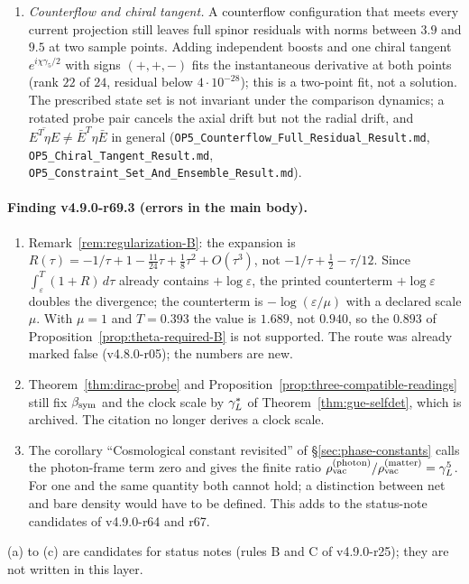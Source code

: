 \begin{enumerate}[leftmargin=2em]
reconstructed geometry requires \(b+3tb'=1\) and \((hb^2)'=0\); the second gives \(b=(1\pm\sqrt{10})/9\), the first \(b=1\).  No differentiable profile exists
(\texttt{OP5\_Isotropic\_Connection\_Ward\_NoGo.md}).
\item[(f)] \emph{Counterflow and chiral tangent.}  A counterflow configuration that meets every current projection still leaves full spinor residuals with norms
between \(3.9\) and \(9.5\) at two sample points.  Adding independent boosts and one chiral tangent \(e^{i\chi\gamma_5/2}\) with signs \((+,+,-)\) fits the
instantaneous derivative at both points (rank \(22\) of \(24\), residual below \(4\cdot10^{-28}\)); this is a two-point fit, not a solution.  The prescribed
state set is not invariant under the comparison dynamics; a rotated probe pair cancels the axial drift but not the radial drift, and
\(\overline{E^T\eta E}\neq\bar E^T\eta\bar E\) in general (\texttt{OP5\_Counterflow\_Full\_Residual\_Result.md}, \texttt{OP5\_Chiral\_Tangent\_Result.md},
\texttt{OP5\_Constraint\_Set\_And\_Ensemble\_Result.md}).
\end{enumerate}

\paragraph{Finding v4.9.0-r69.3 (errors in the main body).}
\begin{enumerate}[leftmargin=2em]
\item[(a)] Remark~\ref{rem:regularization-B}: the expansion is \(R(\tau)=-1/\tau+1-\tfrac{11}{24}\tau+\tfrac18\tau^2+O(\tau^3)\), not
\(-1/\tau+\tfrac12-\tau/12\).  Since \(\int_\varepsilon^T(1+R)\,d\tau\) already contains \(+\log\varepsilon\), the printed counterterm \(+\log\varepsilon\) doubles the
divergence; the counterterm is \(-\log(\varepsilon/\mu)\) with a declared scale \(\mu\).  With \(\mu=1\) and \(T=0.393\) the value is \(1.689\), not \(0.940\), so
the \(0.893\) of Proposition~\ref{prop:theta-required-B} is not supported.  The route was already marked false (v4.8.0-r05); the numbers are new.
\item[(b)] Theorem~\ref{thm:dirac-probe} and Proposition~\ref{prop:three-compatible-readings} still fix \(\beta_{\mathrm{sym}}\) and the clock scale by \(\gamma_L^*\) of
Theorem~\ref{thm:gue-selfdet}, which is archived.  The citation no longer derives a clock scale.
\item[(c)] The corollary ``Cosmological constant revisited'' of \S\ref{sec:phase-constants} calls the photon-frame term zero and gives the finite ratio
\(\rho_{\rm vac}^{(\rm photon)}/\rho_{\rm vac}^{(\rm matter)}=\gamma_L^5\).  For one and the same quantity both cannot hold; a distinction between net and bare
density would have to be defined.  This adds to the status-note candidates of v4.9.0-r64 and r67.
\end{enumerate}
(a) to (c) are candidates for status notes (rules B and C of v4.9.0-r25); they are not written in this layer.

